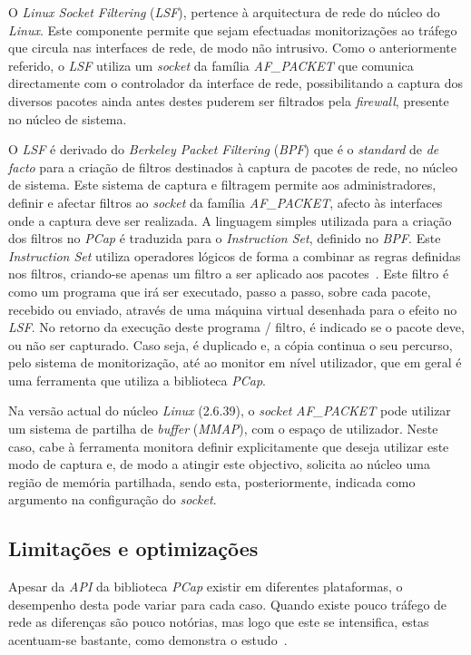 O \textit{Linux Socket Filtering} (\textit{LSF}), pertence à arquitectura de rede do núcleo do \textit{Linux}.
Este componente permite que sejam efectuadas monitorizações ao tráfego que circula nas interfaces de rede, de modo não intrusivo.
Como o anteriormente referido, o \textit{LSF} utiliza um \textit{socket} da família \textit{AF\_PACKET} que comunica directamente com o controlador da interface de rede, possibilitando a captura dos diversos pacotes ainda antes destes puderem ser filtrados pela \textit{firewall}, presente no núcleo de sistema.

O \textit{LSF} é derivado do \textit{Berkeley Packet Filtering} (\textit{BPF}) que é o \textit{standard} de \textit{de facto} para a criação de filtros destinados à captura de pacotes de rede, no núcleo de sistema.
Este sistema de captura e filtragem permite aos administradores, definir e afectar filtros ao \textit{socket} da família \textit{AF\_PACKET}, afecto às interfaces onde a captura deve ser realizada.
A linguagem simples utilizada para a criação dos filtros no \textit{PCap} é traduzida para o \textit{Instruction Set}, definido no \textit{BPF}.
Este \textit{Instruction Set} utiliza operadores lógicos de forma a combinar as regras definidas nos filtros, criando-se apenas um filtro a ser aplicado aos pacotes~\cite{Mccanne92thebsd}.
Este filtro é como um programa que irá ser executado, passo a passo, sobre cada pacote, recebido ou enviado, através de uma máquina virtual desenhada para o efeito no \textit{LSF}.
No retorno da execução deste programa / filtro, é indicado se o pacote deve, ou não ser capturado.
Caso seja, é duplicado e, a cópia continua o seu percurso, pelo sistema de monitorização, até ao monitor em nível utilizador, que em geral é uma ferramenta que utiliza a biblioteca \textit{PCap}.

Na versão actual do núcleo \textit{Linux} (2.6.39), o \textit{socket} \textit{AF\_PACKET} pode utilizar um sistema de partilha de \textit{buffer} (\textit{MMAP}), com o espaço de utilizador.
Neste caso, cabe à ferramenta monitora definir explicitamente que deseja utilizar este modo de captura e, de modo a atingir este objectivo, solicita ao núcleo uma região de memória partilhada, sendo esta, posteriormente, indicada como argumento na configuração do \textit{socket}.

\subsection{Limitações e optimizações}
Apesar da \textit{API} da biblioteca \textit{PCap} existir em diferentes plataformas, o desempenho desta pode variar para cada caso.
Quando existe pouco tráfego de rede as diferenças são pouco notórias, mas logo que este se intensifica, estas acentuam-se bastante, como demonstra o estudo~\cite{Deri2004}.

